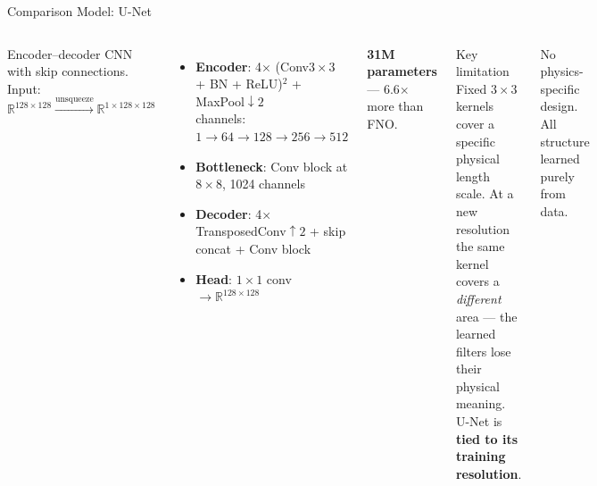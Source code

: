 \documentclass[aspectratio=169, 11pt]{beamer}
\begin{document}
\begin{frame}{Comparison Model: U-Net}
  \begin{columns}[t]
      Encoder--decoder CNN with skip connections.
      Input: $\mathbb{R}^{128\times128}\xrightarrow{\text{unsqueeze}}\mathbb{R}^{1\times128\times128}$

      \begin{itemize}\small
        \item \textbf{Encoder}: 4$\times$ (Conv$3\times3$ + BN + ReLU)$^2$ + MaxPool$\downarrow 2$
              \\channels: $1\to64\to128\to256\to512$
        \item \textbf{Bottleneck}: Conv block at $8\times8$, 1024 channels
        \item \textbf{Decoder}: 4$\times$ TransposedConv$\uparrow 2$ + skip concat + Conv block
        \item \textbf{Head}: $1\times1$ conv $\to \mathbb{R}^{128\times128}$
      \end{itemize}
      \vspace{0.3em}
      \textbf{31M parameters} --- 6.6$\times$ more than FNO.

      \begin{alertblock}{Key limitation}
        Fixed $3\times3$ kernels cover a specific physical length scale.
        At a new resolution the same kernel covers a \emph{different} area
        --- the learned filters lose their physical meaning.
        U-Net is \textbf{tied to its training resolution}.
      \end{alertblock}
      \vspace{0.3em}
      No physics-specific design. All structure learned purely from data.
  \end{columns}
\end{frame}
\end{document}
